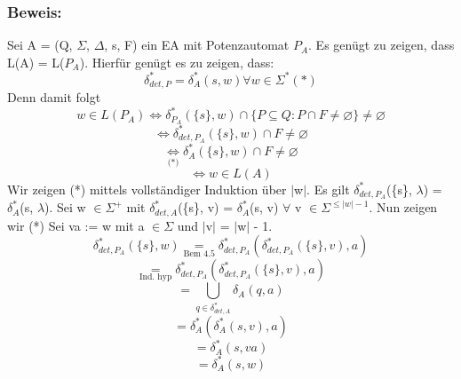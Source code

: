 \documentclass[a4paper,11pt]{article}
\begin{document}
\subsubsection*{Beweis:} 
Sei A = (Q, $\Sigma$, $\Delta$, s, F) ein EA mit Potenzautomat $P_{A}$. Es genügt zu zeigen, dass L(A) = L($P_{A}$). Hierfür genügt es zu zeigen, dass:
\[\delta_{det,P}^{*} = \delta_{A}^{*}(s, w) \forall w \in \Sigma^{*} (*)\]
Denn damit folgt
\[w \in  L (P_{A}) \Leftrightarrow \delta_{P_{A}}^{*}(\{s\}, w) \cap \{P\subseteq Q : P\cap F \neq \varnothing \} \neq \varnothing \] 
\[\Leftrightarrow \delta_{det, P_{A}}^{*}(\{s\}, w) \cap F \neq \varnothing \]
\[\underset{\text{(*)}}{\Leftrightarrow } \delta_{A}^{*}(\{s\}, w) \cap F \neq \varnothing \]
\[\Leftrightarrow w \in L(A)\] Wir zeigen (*) mittels vollständiger Induktion über $\lvert$w$\rvert$. Es gilt $\delta_{det, P_{A}}^{*}$(\{s\}, $\lambda$) = $\delta_{A}^{*}$(s, $\lambda$). Sei w $\in \Sigma^{+}$ mit $\delta_{det, A}^{*}$(\{s\}, v) = $\delta_{A}^{*}$(s, v) $\forall$ v $\in \Sigma^{\leq \lvert w \rvert - 1}$. Nun zeigen wir (*) Sei va := w mit a $\in \Sigma$ und $\lvert$v$\rvert$ = $\lvert$w$\rvert$ - 1.
\[\delta_{det, P_{A}}^{*} (\{s\}, w) \underset{\text{Bem 4.5}}{=} \delta_{det, P_{A}}^{*} (\delta_{det, P_{A}}^{*}(\{s\}, v), a)\]
\[\underset{\text{Ind. hyp}}{=} \delta_{det, P_{A}}^{*}(\delta_{det, P_{A}}^{*}(\{s\}, v), a)\]
\[ = \bigcup \limits_{q \in \delta_{det, A}^{*}}\delta_{A}(q, a)\]
\[ = \delta_{A}^{*}(\delta_{A}^{*}(s, v), a)\]
\[ = \delta_{A}^{*}(s, va)\]
\[ = \delta_{A}^{*}(s, w)\]
\end{document}
